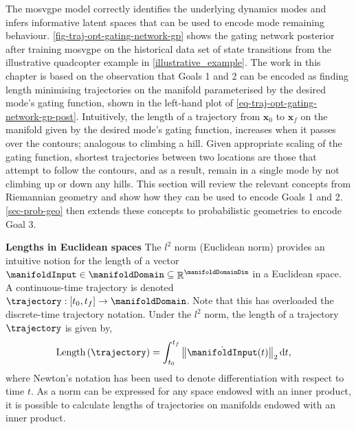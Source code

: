 \documentclass{mimosis-class/mimosis}
\numberwithin{equation}{chapter}
\DeclareMathOperator{\R}{\mathbb{R}}
\begin{document}
{The \acrshort{mosvgpe} model correctly identifies the underlying dynamics modes and infers informative
latent spaces that can be used to encode mode remaining behaviour.
\cref{fig-traj-opt-gating-network-gp} shows the gating network posterior after training
\acrshort{mosvgpe} on the historical data set of state transitions from the illustrative quadcopter
example in \cref{illustrative_example}.
The work in this chapter is based on the observation that
Goals 1 and 2 can be encoded as finding length minimising trajectories on the manifold parameterised by the
desired mode's gating function, shown in the left-hand plot of \cref{eq-traj-opt-gating-network-gp-post}.
Intuitively, the length of a trajectory from \(\mathbf{x}_0\) to \(\mathbf{x}_f\) on the
manifold given by the desired mode's gating function,
increases when it passes over the contours; analogous to climbing a hill.
Given appropriate scaling of the gating function, shortest trajectories between two locations are
those that attempt to follow the contours, and as a result,
remain in a single mode by not climbing up or down any hills.
This section will review the relevant concepts from Riemannian geometry and show how they can be used
to encode Goals 1 and 2.
\cref{sec-prob-geo} then extends these concepts to probabilistic geometries to encode Goal 3.

\newline
\textbf{Lengths in Euclidean spaces}
The \(l^2\) norm (Euclidean norm) provides an intuitive notion for the length of a
vector \(\manifoldInput \in \manifoldDomain \subseteq \R^{\manifoldDomainDim}\) in a Euclidean space.
A continuous-time trajectory is denoted \(\trajectory: [t_0, t_f] \rightarrow \manifoldDomain\).
Note that this has overloaded the discrete-time trajectory notation.
Under the \(l^2\) norm, the length of a trajectory \(\trajectory\) is given by,
\begin{align} \label{eq-euclidean-length}
\text{Length}\left(\trajectory\right)
&= \int_{t_0}^{t_f}\left\|\dot{\manifoldInput}(t)\right\|_2 \mathrm{d}t,
\end{align}
where Newton's notation has been used to denote differentiation with respect to time \(t\).
As a norm can be expressed for any space endowed with an inner product, it is possible to
calculate lengths of trajectories on manifolds endowed with an inner product.

}
\end{document}
